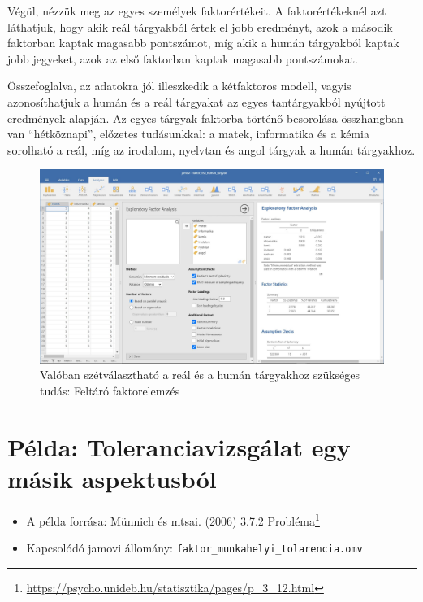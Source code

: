 \documentclass[
  letterpaper,
]{krantz}
\providecommand{\tightlist}{%
  \setlength{\itemsep}{0pt}\setlength{\parskip}{0pt}}\usepackage{longtable,booktabs,array}
\renewcommand{\href}[2]{#2\footnote{\url{#1}}}
\begin{document}
Végül, nézzük meg az egyes személyek faktorértékeit. A faktorértékeknél
azt láthatjuk, hogy akik reál tárgyakból értek el jobb eredményt, azok a
második faktorban kaptak magasabb pontszámot, míg akik a humán
tárgyakból kaptak jobb jegyeket, azok az első faktorban kaptak magasabb
pontszámokat.

Összefoglalva, az adatokra jól illeszkedik a kétfaktoros modell, vagyis
azonosíthatjuk a humán és a reál tárgyakat az egyes tantárgyakból
nyújtott eredmények alapján. Az egyes tárgyak faktorba történő
besorolása összhangban van ``hétköznapi'', előzetes tudásunkkal: a
matek, informatika és a kémia sorolható a reál, míg az irodalom,
nyelvtan és angol tárgyak a humán tárgyakhoz.

\begin{figure}

{\centering \includegraphics{./images/faktor_real_human_targyak_kep_01.jpg}

}

\caption{Valóban szétválasztható a reál és a humán tárgyakhoz szükséges
tudás: Feltáró faktorelemzés}

\end{figure}

\hypertarget{puxe9lda-toleranciavizsguxe1lat-egy-muxe1sik-aspektusbuxf3l}{%
\section{Példa: Toleranciavizsgálat egy másik
aspektusból}\label{puxe9lda-toleranciavizsguxe1lat-egy-muxe1sik-aspektusbuxf3l}}

\begin{itemize}
\tightlist
\item
  A példa forrása: Münnich és mtsai. (2006)
  \href{https://psycho.unideb.hu/statisztika/pages/p_3_12.html}{3.7.2
  Probléma}
\item
  Kapcsolódó jamovi állomány:
  \texttt{faktor\_munkahelyi\_tolarencia.omv}
\end{itemize}
\end{document}
